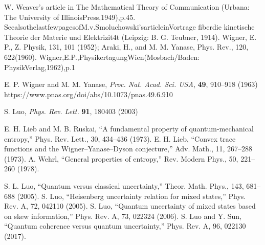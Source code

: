 \begin{thebibliography}{}
 W. Weaver's article in The Mathematical Theory of Communication (Urbana: The University of IllinoisPress,1949),p.45. SeealsothelastfewpagesofM.v.Smoluchowski'sarticleinVortrage fiberdie kinetische Theorie der Materie und Elektrizit4t (Leipzig: B. G. Teubner, 1914).
 Wigner, E. P., Z. Physik, 131, 101 (1952); Araki, H., and M. M. Yanase, Phys. Rev., 120, 622(1960).
 Wigner,E.P.,PhysikertagungWien(Mosbach/Baden: PhysikVerlag,1962),p.1

 E. P. Wigner and M. M. Yanase, \textit{Proc. Nat. Acad. Sci. USA}, \textbf{49}, 910–918 (1963) https://www.pnas.org/doi/abs/10.1073/pnas.49.6.910
    
 S. Luo, \textit{Phys. Rev. Lett.} \textbf{91}, 180403 (2003)

 E. H. Lieb and M. B. Ruskai, “A fundamental property of quantum-mechanical entropy,” Phys. Rev. Lett., 30, 434–436 (1973).
 E. H. Lieb, “Convex trace functions and the Wigner–Yanase–Dyson conjecture,” Adv. Math., 11, 267–288 (1973).
 A. Wehrl, “General properties of entropy,” Rev. Modern Phys., 50, 221–260 (1978).

 S. L. Luo, “Quantum versus classical uncertainty,” Theor. Math. Phys., 143, 681–688 (2005).
 S. Luo, “Heisenberg uncertainty relation for mixed states,” Phys. Rev. A, 72, 042110 (2005).
 S. Luo, “Quantum uncertainty of mixed states based on skew information,” Phys. Rev. A, 73, 022324 (2006).
 S. Luo and Y. Sun, “Quantum coherence versus quantum uncertainty,” Phys. Rev. A, 96, 022130 (2017).


\end{thebibliography}
